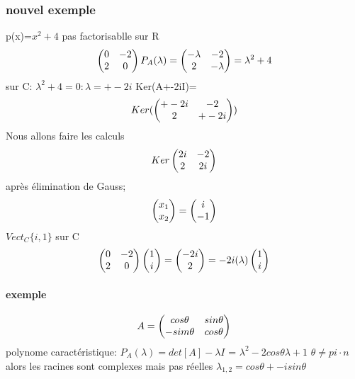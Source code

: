 \documentclass[a4paper,10pt]{article}
\begin{document}
\subsubsection{nouvel exemple}
p(x)=$x^2+4$ pas factorisablle sur R
\newline
\[
\begin{pmatrix}
 0&-2\cr
 2&0\cr
\end{pmatrix}
P_A(\lambda)=
\begin{pmatrix}
 -\lambda&-2\cr
 2&-\lambda\cr
\end{pmatrix}
=\lambda^2+4
\]
\newline
sur C: $\lambda^2+4=0: \lambda=+-2i$
\newline
Ker(A+-2iI)=
\newline
\[
Ker(\begin{pmatrix}
     +-2i&-2\cr
     2&+-2i\cr
    \end{pmatrix}
)
\]
\newline
Nous allons faire les calculs
\newline
\[
Ker\begin{pmatrix}
    2i&-2\cr
    2&2i\cr
   \end{pmatrix}
\]
\newline
après élimination de Gauss; 
\newline
\[
\begin{pmatrix}
 x_1\cr
 x_2\cr
\end{pmatrix}
=
\begin{pmatrix}
 i\cr
 -1\cr
\end{pmatrix}
\]
\newline
$Vect_C\{i,1\}$ sur C
\newline
\[
\begin{pmatrix}
 0&-2\cr
 2&0\cr
\end{pmatrix}
\begin{pmatrix}
 1\cr
 i\cr
\end{pmatrix}
=
\begin{pmatrix}
 -2i\cr
 2\cr
\end{pmatrix}
=-2i(\lambda)
\begin{pmatrix}
 1\cr
 i\cr
\end{pmatrix}
\]
\paragraph{exemple}
\[
A=
\begin{pmatrix}
 cos\theta&sin\theta\cr
 -sim\theta&cos\theta
\end{pmatrix}
\]
\newline
polynome caractéristique:
\newline
$P_A(\lambda)=det[A]-\lambda I$ = $\lambda^2-2cos\theta\lambda+1$
\newline
$\theta\neq pi\cdot n$ alors les racines sont complexes mais pas réelles
\newline
$\lambda_{1,2}=cos\theta+-isin\theta$
\end{document}
